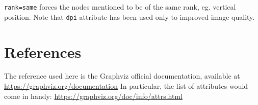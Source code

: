 \documentclass{article}
\begin{document}
	

	\lstinline{rank=same} forces the nodes mentioned to be of the same rank, eg. vertical position. Note that \lstinline{dpi} attribute has been used only to improved image quality.

	\section{References}
	The reference used here is the Graphviz official documentation, available at\newline
		\url{https://graphviz.org/documentation} \newline
	In particular, the list of attributes would come in handy:\newline
		\url{https://graphviz.org/doc/info/attrs.html}
\end{document}
